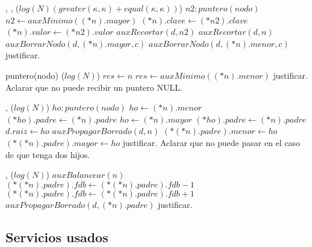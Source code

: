 {   ,
    ,
    }
{}
{\bigo($log(N)(greater(\kappa, \kappa)+equal(\kappa, \kappa))$)}
{   
            \var $n2 : puntero(nodo)$
            \State $n2 \gets auxMinimo((*n).mayor)$
            \State $(*n).clave \gets (*n2).clave$
            \State $(*n).valor \gets (*n2).valor$
            \State $auxRecortar(d, n2)$
        \Else
            \State $auxRecortar(d, n)$
        \EndIf
    \Else
            \State $auxBorrarNodo(d, (*n).mayor, c)$
        \Else
            \State $auxBorrarNodo(d, (*n).menor, c)$
        \EndIf
    \EndIf
}
{   \cuidado justificar. }

{   }
{puntero(nodo)}
{\bigo($log(N)$)}
{   
        \State $res \gets n$
    \Else
        \State $res \gets auxMinimo((*n).menor)$
    \EndIf
}
{   \cuidado justificar. Aclarar que no puede recibir un puntero NULL. }

{   ,
    }
{}
{\bigo($log(N)$)}
{   \var $ho : puntero(nodo)$
        \State $ho \gets (*n).menor$
        \State $(*ho).padre \gets (*n).padre$
    \EndIf
        \State $ho \gets (*n).mayor$
        \State $(*ho).padre \gets (*n).padre$
    \EndIf
        \State $d.raiz \gets ho$
    \Else
        \State $auxPropagarBorrado(d, n)$
            \State $(*(*n).padre).menor \gets ho$
        \Else
            \State $(*(*n).padre).mayor \gets ho$
        \EndIf
    \EndIf
}
{   \cuidado justificar. Aclarar que no puede pasar en el caso de que tenga dos hijos. }


{   ,
    }
{}
{\bigo($log(N)$)}
{   
        \State $auxBalancear(n)$
    \EndIf
            \State $(*(*n).padre).fdb \gets (*(*n).padre).fdb - 1$
        \Else
            \State $(*(*n).padre).fdb \gets (*(*n).padre).fdb + 1$
        \EndIf
        \State $auxPropagarBorrado(d, (*n).padre)$
    \EndIf
}
{   \cuidado justificar. }


\subsection{Servicios usados}


